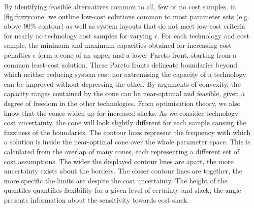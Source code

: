 By identifying feasible alternatives common to all, few or no cost samples, in
\cref{fig:fuzzycone} we outline low-cost solutions common to most parameter sets
(e.g. above 90\% contour) as well as system layouts that do not meet low-cost
criteria for nearly no technology cost samples for varying $\epsilon$. For each
technology and cost sample, the minimum and maximum capacities obtained for
increasing cost penalties $\epsilon$ form a cone of an upper and a lower Pareto
front, starting from a common least-cost solution. These Pareto fronts delineate
boundaries beyond which neither reducing system cost nor extremising the
capacity of a technology can be improved without depressing the other. By
arguments of convexity, the capacity ranges contained by the cone can be
near-optimal and feasible, given a degree of freedom in the other technologies.
From optimisation theory, we also know that the cones widen up for increased
slacks. As we consider technology cost uncertainty, the cone will look slightly
different for each sample causing the fuzziness of the boundaries. The contour
lines represent the frequency with which a solution is inside the near-optimal
cone over the whole parameter space. This is calculated from the overlap of many
cones, each representing a different set of cost assumptions. The wider the
displayed contour lines are apart, the more uncertainty exists about the
borders. The closer contour lines are together, the more specific the limits are
despite the cost uncertainty. The height of the quantiles quantifies flexibility
for a given level of certainty and slack; the angle presents information about
the sensitivity towards cost slack.

